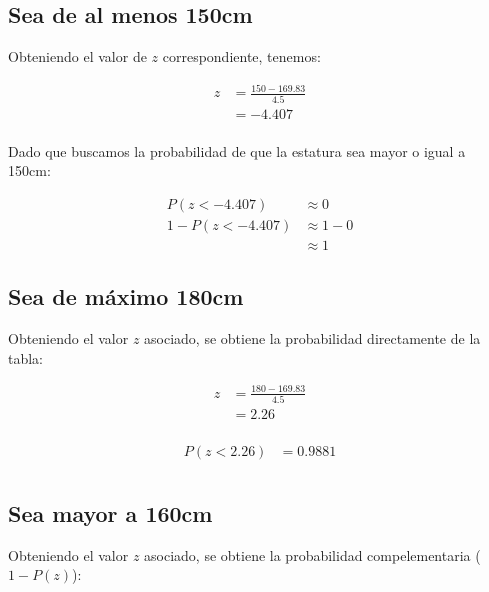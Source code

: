 \documentclass[letterpaper,12pt]{memoir}
\theoremstyle{definition}
\begin{document}
\subsection*{Sea de al menos 150cm}

Obteniendo el valor de \(z\) correspondiente, tenemos:

\begin{equation*}
  \begin{split}
  z &= \frac{150 - 169.83}{4.5}\\
  &= -4.407\\
  \end{split}
\end{equation*}

Dado que buscamos la probabilidad de que la estatura sea mayor o igual a 150cm:

\begin{equation*}
  \begin{split}
  P(z < -4.407)&\approx 0\\
  1 - P(z < -4.407)&\approx 1-0\\
  &\approx 1
  \end{split}
\end{equation*}

\subsection*{Sea de máximo 180cm}

Obteniendo el valor \(z\) asociado, se obtiene la probabilidad directamente de la tabla:


\begin{equation*}
  \begin{split}
  z &= \frac{180 - 169.83}{4.5}\\
  &= 2.26\\
  \end{split}
\end{equation*}

\begin{equation*}
  \begin{split}
  P(z < 2.26)&= 0.9881\\
  \end{split}
\end{equation*}

\subsection*{Sea mayor a 160cm}

Obteniendo el valor \(z\) asociado, se obtiene la probabilidad compelementaria (\(1 - P(z)\)):
\end{document}
